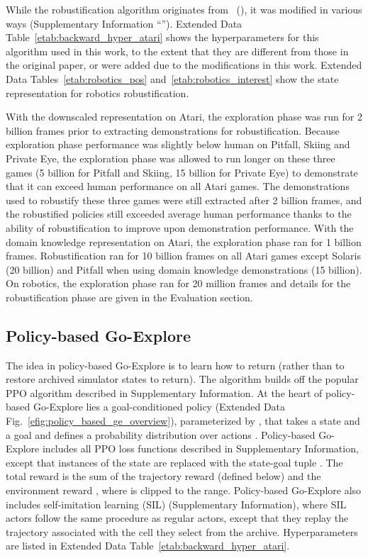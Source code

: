 \documentclass{nature}
\renewcommand*{\cite}[1]{\supercite{#1}}
\newcommand{\citefull}[1]{\citeauthor{#1}~(\citeyear{#1})\cite{#1}}
\begin{document}
\begin{methods}
While the robustification algorithm originates from \citefull{salimans2018learning}, it was modified in various ways
(Supplementary Information ``''). Extended Data Table~\ref{etab:backward_hyper_atari} shows the hyperparameters for this algorithm used in this work, to the extent that they are different from those in the original paper, or were added due to the modifications in this work. Extended Data Tables~\ref{etab:robotics_pos} and~\ref{etab:robotics_interest} show the state representation for robotics robustification. 

With the downscaled representation on Atari, the exploration phase was run for 2 billion frames prior to extracting demonstrations for robustification. Because exploration phase performance was slightly below human on Pitfall, Skiing and Private Eye, the exploration phase was allowed to run longer on these three games (5 billion for Pitfall and Skiing, 15 billion for Private Eye) to demonstrate that it can exceed human performance on all Atari games. The demonstrations used to robustify these three games were still extracted after 2 billion frames, and the robustified policies still exceeded average human performance thanks to the ability of robustification to improve upon demonstration performance. With the domain knowledge representation on Atari, the exploration phase ran for 1 billion frames. Robustification ran for 10 billion frames on all Atari games except Solaris (20 billion) and Pitfall when using domain knowledge demonstrations (15 billion). On robotics, the exploration phase ran for 20 million frames and details for the robustification phase are given in the Evaluation section.

    




\subsection{Policy-based Go-Explore}
\label{sec:policy_based}

The idea in policy-based Go-Explore is to learn how to return (rather than to restore archived simulator states to return). The algorithm builds off the popular PPO algorithm\cite{Schulman2017ProximalPO} described in Supplementary Information.
At the heart of policy-based Go-Explore lies a goal-conditioned policy  (Extended Data Fig.~\ref{efig:policy_based_ge_overview}), parameterized by , that takes a state  and a goal  and defines a probability distribution over actions .
Policy-based Go-Explore includes all PPO loss functions described in Supplementary Information, except that instances of the state  are replaced with the state-goal tuple .
The total reward  is the sum of the trajectory reward  (defined below) and the environment reward , where  is clipped to the  range. 
Policy-based Go-Explore also includes self-imitation learning (SIL)\cite{Oh2018SelfImitationL} (Supplementary Information), where SIL actors follow the same procedure as regular actors, except that they replay the trajectory associated with the cell they select from the archive.
Hyperparameters are listed in Extended Data Table~\ref{etab:backward_hyper_atari}.


\end{methods}
\end{document}
